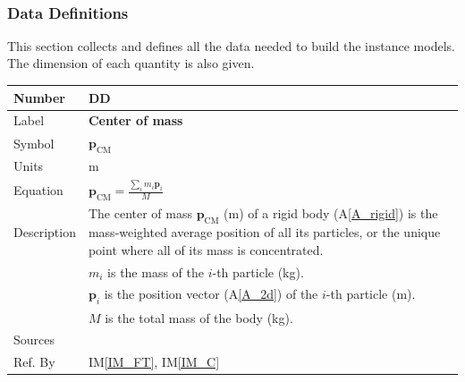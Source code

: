\documentclass[12pt]{article}
\newcommand{\colAwidth}{0.13\textwidth}
\newcommand{\colBwidth}{0.82\textwidth}
\newcounter{defnum} %
\newcounter{datadefnum} %
\newcommand{\aref}[1]{A\ref{#1}}
\begin{document}
~\newpage

\subsubsection{Data Definitions}\label{sec_datadef}

This section collects and defines all the data needed to build the instance
models. The dimension of each quantity is also given. \\


\noindent
\begin{minipage}{\textwidth}
	\renewcommand*{\arraystretch}{1.5}
	\begin{tabular}{| p{\colAwidth} | p{\colBwidth} |}
		\hline
		\rowcolor[gray]{0.9}
		Number & DD{datadefnum}\thedatadefnum \label{DD_CM}\\
		\hline
		Label & \textbf{Center of mass} \\
		\hline
		Symbol & $\mathbf{p}_\mathrm{CM}$ \\
		\hline
		Units & \si{\metre} \\
		\hline
		Equation &  $\mathbf{p}_\mathrm{CM} = \frac{\sum_i m_i\mathbf{p}_i}{M}$ \\
		\hline
		Description & The center of mass $\mathbf{p}_\mathrm{CM}$ (\si{\metre}) of a rigid body (\aref{A_rigid})
            is the mass-weighted average position of all its particles, or the unique point where all of its mass is concentrated. \\
		& $m_i$ is the mass of the $i$-th particle (\si{\kilogram}). \\
		& $\mathbf{p}_i$ is the position vector (\aref{A_2d}) of the $i$-th particle (\si{\metre}). \\
		& $M$ is the total mass of the body (\si{\kilogram}). \\
		\hline
		Sources & \\
		\hline
		Ref. By & IM\ref{IM_FT}, IM\ref{IM_C} \\
		\hline
	\end{tabular}
\end{minipage}

~\newline
\end{document}

